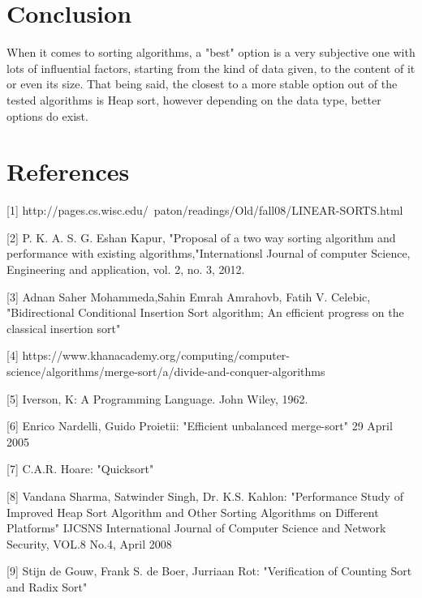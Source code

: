 \documentclass{article}
\begin{document}
\pagebreak
\section{Conclusion}
When it comes to sorting algorithms, a "best" option is a very subjective one with lots of influential factors, starting from the kind of data given, to the content of it or even its size. That being said, the closest to a more stable option out of the tested algorithms is Heap sort, however depending on the data type, better options do exist.

\section{References}
[1] http://pages.cs.wisc.edu/~paton/readings/Old/fall08/LINEAR-SORTS.html
\newline

[2] P. K. A. S. G. Eshan Kapur, "Proposal of a two way sorting algorithm and performance with existing algorithms,"Internationsl Journal of computer Science, Engineering and application, vol. 2, no. 3, 2012.
\newline

[3] Adnan Saher Mohammeda,Sahin Emrah Amrahovb, Fatih V. Celebic, "Bidirectional Conditional Insertion Sort algorithm; An efficient progress on the classical insertion sort"
\newline

[4] https://www.khanacademy.org/computing/computer-science/algorithms/merge-sort/a/divide-and-conquer-algorithms
\newline

[5] Iverson, K: A Programming Language. John Wiley, 1962.
\newline

[6] Enrico Nardelli, Guido Proietii: "Efficient unbalanced merge-sort" 29 April 2005
\newline

[7] C.A.R. Hoare: "Quicksort"
\newline

[8] Vandana Sharma, Satwinder Singh, Dr. K.S. Kahlon: "Performance Study of Improved Heap Sort Algorithm and
Other Sorting Algorithms on Different Platforms" IJCSNS International Journal of Computer Science and Network Security, VOL.8 No.4, April 2008
\newline

[9] Stijn de Gouw, Frank S. de Boer, Jurriaan Rot: "Verification of Counting Sort and Radix Sort"
\newline
\end{document}
